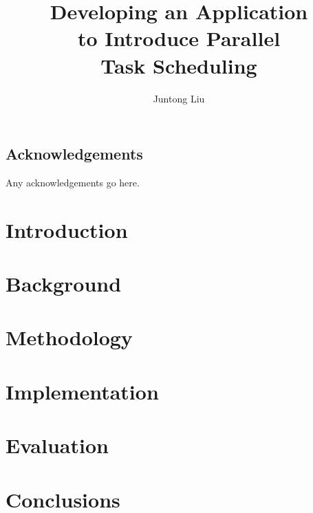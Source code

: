 \documentclass[msc,deptreport, cs]{infthesis}
\begin{document}
\begin{preliminary}

\title{Developing an Application \\to Introduce Parallel \\Task Scheduling}

\author{Juntong Liu}

\abstract{
}

\maketitle

\section*{Acknowledgements}
Any acknowledgements go here. 

\tableofcontents
\end{preliminary}


\chapter{Introduction}


\chapter{Background}

\chapter{Methodology}

\chapter{Implementation}

\chapter{Evaluation}

\chapter{Conclusions}



\end{document}
